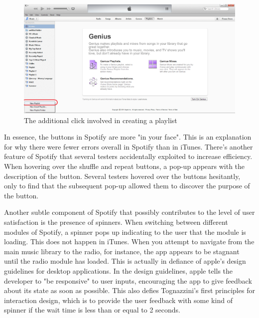 \documentclass[12pt]{article}
\begin{document}
\begin{figure}[H]
	\centering
	\includegraphics[width=.75\textwidth]{chart9.png}
	\caption{The additional click involved in creating a 
playlist}
\end{figure}


 In essence, the buttons in Spotify are more "in your face". This 
is an explanation for why there were fewer errors overall in 
Spotify than in iTunes. There's another feature of Spotify that 
several testers accidentally exploited to increase efficiency. 
When hovering over the shuffle and repeat buttons, a pop-up 
appears with the description of the button. Several testers 
hovered over the buttons hesitantly, only to find that the 
subsequent pop-up allowed them to discover the purpose of the 
button.

Another subtle component of Spotify that possibly contributes to 
the level of user satisfaction is the presence of spinners. When 
switching between different modules of Spotify, a spinner pops up 
indicating to the user that the module is loading. This does not 
happen in iTunes. When you attempt to navigate from the main music 
library to the radio, for instance, the app appears to be stagnant 
until the radio module has loaded. This is actually in defiance of 
apple's design guidelines  for desktop applications. In the design 
guidelines, apple tells the developer to  "be responsive" to user 
inputs, encouraging the app to give feedback about its state as 
soon as possible. This also defies Tognazzini's first principles 
for interaction design, which is to provide the user feedback with 
some kind of spinner if the wait time is less than or equal to 2 
seconds.
\end{document}
